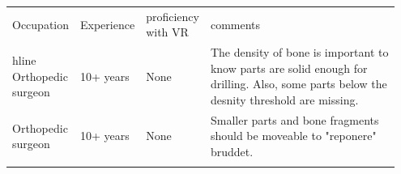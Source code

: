 \documentclass[a4paper]{report}
\begin{document}
\begin{table}[ht]
\begin{tabular}{p{0.15\linewidth} |p{0.15\linewidth} |p{0.15\linewidth} | p{0.5\linewidth}}
Occupation         & Experience & proficiency with VR & comments                                                                                                                                \\hline
Orthopedic surgeon & 10+ years  & None                & The density of bone is important to know parts are solid enough for drilling. Also, some parts below the desnity threshold are missing. \\
Orthopedic surgeon & 10+ years  & None                & Smaller parts and bone fragments should be moveable to "reponere" bruddet.                                                              \\
                   &            &                     &
\end{tabular}
\end{table}


%
%
\printbibliography
\end{document}
